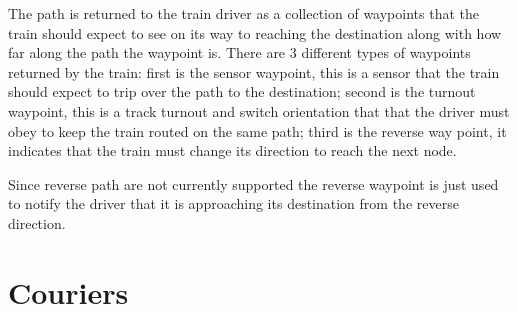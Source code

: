 \documentclass[pdftex,10pt,a4paper]{article}
\begin{document}
The path is returned to the train driver as a collection of waypoints that the
train should expect to see on its way to reaching the destination along with
how far along the path the waypoint is. There are 3 different types of
waypoints returned by the train: first is the sensor waypoint, this is a sensor
that the train should expect to trip over the path to the destination; second
is the turnout waypoint, this is a track turnout and switch orientation that
that the driver must obey to keep the train routed on the same path; third is
the reverse way point, it indicates that the train must change its direction to
reach the next node.

Since reverse path are not currently supported the reverse waypoint is just used
to notify the driver that it is approaching its destination from the reverse
direction.

\section*{Couriers}
\end{document}
